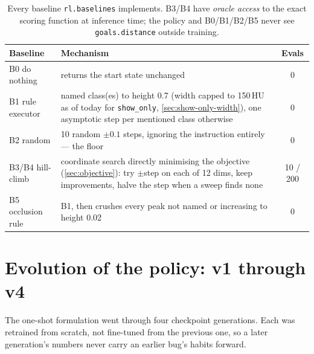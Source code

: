\documentclass[10pt]{article}
\newcommand{\code}[1]{\texttt{#1}}
\begin{document}
\begin{table}[h]
\centering\small
\begin{tabular}{@{}lp{9.3cm}c@{}}
\toprule
\textbf{Baseline} & \textbf{Mechanism} & \textbf{Evals} \\
\midrule
B0 do nothing & returns the start state unchanged & 0 \\
B1 rule executor & named class(es) to height 0.7 (width capped to 150\,HU
  as of today for \code{show\_only}, \cref{sec:show-only-width}), one
  asymptotic step per mentioned class otherwise & 0 \\
B2 random & 10 random $\pm 0.1$ steps, ignoring the instruction entirely --- the floor & 0 \\
B3/B4 hill-climb & coordinate search directly minimising the objective
  (\cref{sec:objective}): try $\pm$step on each of 12 dims, keep
  improvements, halve the step when a sweep finds none & 10 / 200 \\
B5 occlusion rule & B1, then crushes every peak not named or increasing to height 0.02 & 0 \\
\bottomrule
\end{tabular}
\caption{Every baseline \code{rl.baselines} implements. B3/B4 have
\emph{oracle access} to the exact scoring function at inference time; the
policy and B0/B1/B2/B5 never see \code{goals.distance} outside training.}
\end{table}

\newpage
\section{Evolution of the policy: v1 through v4}
\label{sec:evolution}

The one-shot formulation went through four checkpoint generations. Each was
retrained from scratch, not fine-tuned from the previous one, so a later
generation's numbers never carry an earlier bug's habits forward.
\end{document}
